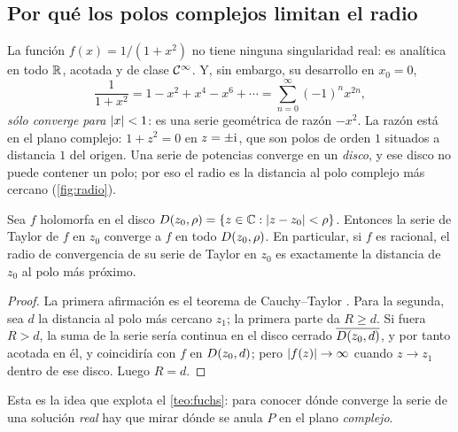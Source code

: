 \subsection{Por qué los polos complejos limitan el radio}\label{sec:radio}
La función $f(x)=1/(1+x^{2})$ no tiene ninguna singularidad real: es
analítica en todo $\mathbb{R}$, acotada y de clase $\mathcal{C}^{\infty}$. Y, sin embargo, su
desarrollo en $x_0=0$,
\begin{equation}\label{eq:lorentz}
  \frac{1}{1+x^{2}}=1-x^{2}+x^{4}-x^{6}+\cdots=\sum_{n=0}^{\infty}(-1)^{n}x^{2n},
\end{equation}
\emph{sólo converge para $\lvert x\rvert<1$}: es una serie geométrica de razón
$-x^{2}$. La razón está en el plano complejo: $1+z^{2}=0$ en $z=\pm\mathrm{i}$, que
son polos de orden $1$ situados a distancia $1$ del origen. Una serie de
potencias converge en un \emph{disco}, y ese disco no puede contener un
polo; por eso el radio es la distancia al polo complejo más cercano
(\cref{fig:radio}).

\begin{teorema}\label{teo:radio}
Sea $f$ holomorfa en el disco $D(z_0,\rho)=\{z\in\mathbb{C}:\lvert z-z_0\rvert<\rho\}$.
Entonces la serie de Taylor de $f$ en $z_0$ converge a $f$ en todo
$D(z_0,\rho)$. En particular, si $f$ es racional, el radio de
convergencia de su serie de Taylor en $z_0$ es exactamente la distancia de
$z_0$ al polo más próximo.
\end{teorema}

\begin{proof}
La primera afirmación es el teorema de Cauchy--Taylor \cite[§4.3]{AHLFORS}.
Para la segunda, sea $d$ la distancia al polo más cercano $z_1$; la primera
parte da $R\ge d$. Si fuera $R>d$, la suma de la serie sería continua en el
disco cerrado $\overline{D(z_0,d)}$, y por tanto acotada en él, y
coincidiría con $f$ en $D(z_0,d)$; pero $\lvert f(z)\rvert\to\infty$ cuando
$z\to z_1$ dentro de ese disco. Luego $R=d$.
\end{proof}



Esta es la idea que explota el \cref{teo:fuchs}: para conocer dónde
converge la serie de una solución \emph{real} hay que mirar dónde se anula
$P$ en el plano \emph{complejo}.
